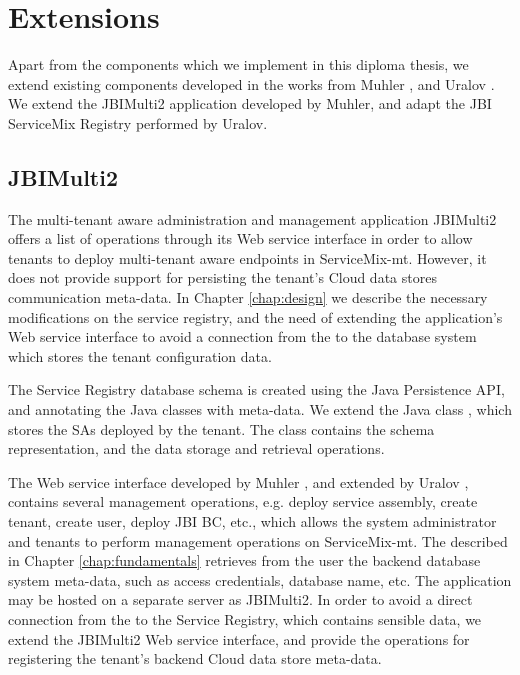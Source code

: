\section{Extensions}
\label{sec:extensions}

Apart from the components which we implement in this diploma thesis, we extend existing components developed in the works from Muhler \cite{Muhler2012}, and Uralov \cite{Uralov2012}. We extend the JBIMulti2 application developed by Muhler, and adapt the \ac{JBI} ServiceMix Registry performed by Uralov. 


\subsection{JBIMulti2} 

The multi-tenant aware administration and management application JBIMulti2 offers a list of operations through its Web service interface in order to allow tenants to deploy multi-tenant aware endpoints in ServiceMix-mt. However, it does not provide support for persisting the tenant's Cloud data stores communication meta-data. In Chapter \ref{chap:design} we describe the necessary modifications on the service registry, and the need of extending the application's Web service interface to avoid a connection from the  to the database system which stores the tenant configuration data. 

The Service Registry database schema is created using the Java Persistence \ac{API}, and annotating the Java classes with meta-data. We extend the Java class , which stores the \ac{SA}s deployed by the tenant. The  class contains the schema representation, and the data storage and retrieval operations.

The Web service interface developed by Muhler \cite{Muhler2012}, and extended by Uralov \cite{Uralov2012}, contains several management operations, e.g. deploy service assembly, create tenant, create user, deploy \ac{JBI} BC, etc., which allows the system administrator and tenants to perform management operations on ServiceMix-mt. The  described in Chapter \ref{chap:fundamentals} retrieves from the user the backend database system meta-data, such as access credentials, database name, etc. The application may be hosted on a separate server as JBIMulti2. In order to avoid a direct connection from the  to the Service Registry, which contains sensible data, we extend the JBIMulti2 Web service interface, and provide the operations for registering the tenant's backend Cloud data store meta-data. 

